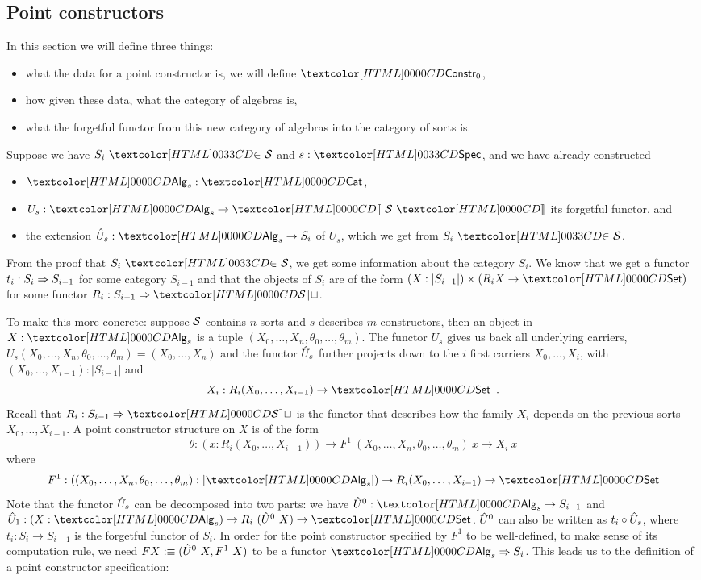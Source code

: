 \subsection{Point constructors}
\label{point-constructors}

In this section we will define three things:
%
\begin{itemize}
\item what the data for a point constructor is, \ie we will define $\Constr_0$,
\item how given these data, what the category of algebras is,
\item what the forgetful functor from this new category of algebras
  into the category of sorts is.
\end{itemize}
%
Suppose we have $\sortsin{S_i}{\Ss}$ and $s : \specty$, and we have
already constructed
%
\begin{itemize}
\item $\Alg_s : \Cat$,
\item $U_s : \Alg_s \to \SortCat{\Ss}$ its forgetful functor, and
\item the extension $\extendfunc{U}_s : \Alg_s \to S_i$ of $U_s$, which we
  get from $\sortsin{S_i}{\Ss}$.
\end{itemize}
%
From the proof that $\sortsin{S_i}{\Ss}$, we get some information
about the category $S_i$. We know that we get a functor
$t_i : S_i \Rightarrow S_{i-1}$ for some category $S_{i-1}$ and that the
objects of $S_i$ are of the form
$(X : | S_{i-1} |) \times (R_i X \to \Set)$ for some functor
$R_i : \Func{S_{i-1}}{\SET}$.

To make this more concrete: suppose $\mathcal{S}$ contains $n$ sorts and $s$
describes $m$ constructors, then an object in $X : \Alg_s$ is a tuple
$(X_0, \hdots, X_n, \theta_0, \hdots, \theta_m)$. The functor $U_s$
gives us back all underlying carriers, \ie
$U_s(X_0, \hdots, X_n, \theta_0, \hdots, \theta_m) = (X_0, \hdots,
X_n)$
and the functor $\hat{U}_s$ further projects down to the $i$ first
carriers $X_0, \hdots, X_i$, with
$(X_0, \hdots, X_{i-1}) : | S_{i-1} |$ and
\[
X_i : R_i (X_0, \hdots, X_{i-1}) \to \Set \enspace .
\]
Recall that $R_i : \Func{S_{i-1}}{\SET}$ is the functor that describes how
the family $X_i$ depends on the previous sorts $X_0, \hdots,
X_{i-1}$. A point constructor structure on $X$ is of the form
$$
\theta : (x : R_i (X_0, \hdots, X_{i-1})) \to F^1\ (X_0, \hdots, X_n, \theta_0, \hdots, \theta_m)\ x \to X_i\ x
$$
where
$$
F^1 : ((X_0,\hdots,X_n,\theta_0,\hdots,\theta_m) : | \Alg_s |) \to R_i (X_0, \hdots, X_{i-1}) \to \Set
$$
Note that the functor $\hat{U}_s$ can be decomposed into two parts: we
have $\extendfunc{U}^0 : \Alg_s \to S_{i-1}$ and
$\extendfunc{U}_1 : (X : \Alg_s) \to R_i\ (\extendfunc{U}^0\ X) \to \Set$.
$\hat{U}^0$ can also be written as $t_i \circ \hat{U}_s$, where
$t_i : S_i \to S_{i-1}$ is the forgetful functor of $S_i$. In order
for the point constructor specified by $F^1$ to be well-defined, \ie
to make sense of its computation rule, we need
$F X :\equiv (\hat{U}^0\ X, F^1\ X)$ to be a functor
$\Func{\Alg_s}{S_i}$.  This leads us to the definition of a point
constructor specification:

